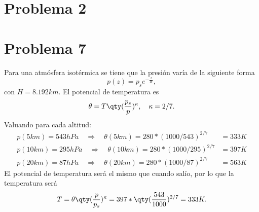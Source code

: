 \vspace{0.5cm}


\section*{Problema 2}




	
\section*{Problema 7}
Para una atmósfera isotérmica se tiene que la presión varía de la siguiente forma
	$$ p(z) = p_s e^{-\frac{z}{H}}, $$
con $H = 8.192km$. El potencial de temperatura es
	$$ \theta = T\qty(\frac{p_s}{p})^\kappa, \quad \kappa = 2/7. $$
Valuando para cada altitud:
	\begin{align*}
		p(5km) = 543hPa \quad \Rightarrow \quad \theta (5km) = 280*(1000/543)^{2/7} &= 333K \\
		p(10km) = 295hPa \quad \Rightarrow \quad \theta (10km) = 280*(1000/295)^{2/7} &= 397K \\
		p(20km) = 87hPa \quad \Rightarrow \quad \theta (20km) = 280*(1000/87)^{2/7} &= 563K
	\end{align*}
El potencial de temperatura será el mismo que cuando salío, por lo que la temperatura será
	$$ T = \theta \qty(\frac{p}{p_s})^\kappa = 397*\qty(\frac{543}{1000})^{2/7} = 333K. $$



















